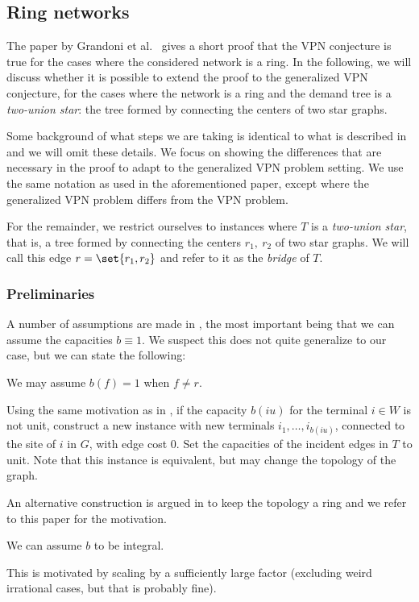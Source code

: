 \subsection{Ring networks}
The paper by Grandoni et al.~\cite{grandoni2008short} gives a short proof that the VPN conjecture is true for the cases where the considered network is a ring.
In the following, we will discuss whether it is possible to extend the proof to the generalized VPN conjecture, for the cases where the network is a ring and the demand tree is a \emph{two-union star}: the tree formed by connecting the centers of two star graphs.

Some background of what steps we are taking is identical to what is described in \cite{grandoni2008short} and we will omit these details.
We focus on showing the differences that are necessary in the proof to adapt to the generalized VPN problem setting.
We use the same notation as used in the aforementioned paper, except where the generalized VPN problem differs from the VPN problem.

For the remainder, we restrict ourselves to instances where $T$ is a \emph{two-union star}, that is, a tree formed by connecting the centers $r_1,\ r_2$ of two star graphs.
We will call this edge $r = \set{r_1, r_2}$ and refer to it as the \emph{bridge} of $T$.

\subsubsection{Preliminaries}
A number of assumptions are made in \cite{grandoni2008short}, the most important being that we can assume the capacities $b \equiv 1$.
We suspect this does not quite generalize to our case, but we can state the following:

\begin{fact}
    We may assume $b(f) = 1$ when $f \neq r$.
\end{fact}
Using the same motivation as in \cite{grandoni2008short}, if the capacity $b(iu)$ for the terminal $i \in W$ is not unit, construct a new instance with new terminals $i_1, \dots, i_{b(iu)}$, connected to the site of $i$ in $G$, with edge cost $0$.
Set the capacities of the incident edges in $T$ to unit.
Note that this instance is equivalent, but may change the topology of the graph.

An alternative construction is argued in \cite{grandoni2008short} to keep the topology a ring and we refer to this paper for the motivation.

\begin{fact}
    We can assume $b$ to be integral.
\end{fact}
This is motivated by scaling by a sufficiently large factor (excluding weird irrational cases, but that is probably fine).

